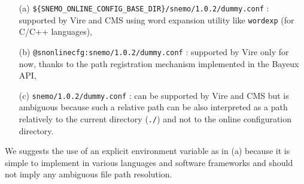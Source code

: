 \begin{itemize}

\item[(a)]
  \verb|${SNEMO_ONLINE_CONFIG_BASE_DIR}/snemo/1.0.2/dummy.conf|       :
  supported  by  Vire  and  CMS  using  word  expansion  utility  like
  \texttt{wordexp} (for C/C++ languages),

\item[(b)]  \verb|@snonlinecfg:snemo/1.0.2/dummy.conf|  : supported  by
  Vire  only  for  now,  thanks to  the  path  registration  mechanism
  implemented in the Bayeux API,

\item[(c)] \verb|snemo/1.0.2/dummy.conf| : can be supported by Vire and
  CMS  but  is  ambiguous  because  such a relative  path  can  be  also
  interpreted as a path relatively  to the current directory (\verb|./|)
  and not to the online configuration directory.

\end{itemize}

We suggests  the use  of an  explicit environment  variable as  in (a)
because it  is simple to  implement in various languages  and software
frameworks and should not imply any ambiguous file path resolution.

\vfill
\pagebreak
\clearpage

